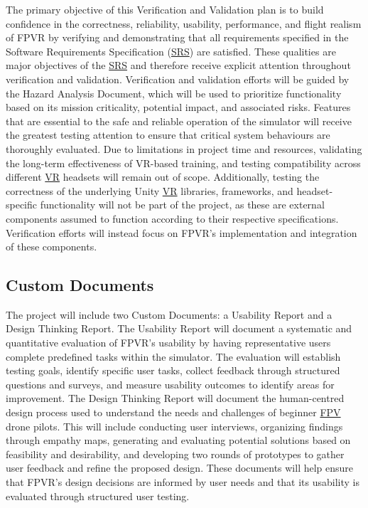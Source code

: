 \documentclass[12pt, titlepage]{article}
\begin{document}
The primary objective of this Verification and Validation plan is to build confidence in the correctness, reliability, usability, performance, and flight realism of FPVR by verifying and demonstrating that all requirements specified in the Software Requirements Specification (\hyperlink{abbr:SRS}{SRS}) are satisfied. These qualities are major objectives of the \hyperlink{abbr:SRS}{SRS} and therefore receive explicit attention throughout verification and validation. Verification and validation efforts will be guided by the Hazard Analysis Document, which will be used to prioritize functionality based on its mission criticality, potential impact, and associated risks. Features that are essential to the safe and reliable operation of the simulator will receive the greatest testing attention to ensure that critical system behaviours are thoroughly evaluated. Due to limitations in project time and resources, validating the long-term effectiveness of VR-based training, 
and testing compatibility across different \hyperlink{abbr:VR}{VR} headsets will remain out of scope. Additionally, testing the correctness of the underlying Unity \hyperlink{abbr:VR}{VR} libraries, frameworks, and headset-specific functionality will not be part of the project, as these are external components assumed to function according to their respective specifications. Verification efforts will instead focus on FPVR's implementation and integration of these components.

\subsection{Custom Documents}

The project will include two Custom Documents: a Usability Report and a Design Thinking Report. The Usability Report will document a systematic and quantitative evaluation of FPVR's usability by having representative users complete predefined tasks within the simulator. The evaluation will establish testing goals, identify specific user tasks, collect feedback through structured questions and surveys, and measure usability outcomes to identify areas for improvement. The Design Thinking Report will document the human-centred design process used to understand the needs and challenges of beginner \hyperlink{abbr:FPV}{FPV} drone pilots. This will include conducting user interviews, organizing findings through empathy maps, generating and evaluating potential solutions based on feasibility and desirability, and developing two rounds of prototypes to gather user feedback and refine the proposed design. These documents will help ensure that FPVR's design decisions are informed by user needs and that its usability is evaluated through structured user testing.
\end{document}
